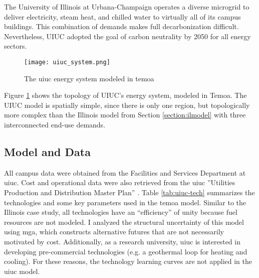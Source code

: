 
The University of Illinois at Urbana-Champaign operates a diverse microgrid to
deliver electricity, steam heat, and chilled water to virtually all of its
campus buildings. This combination of demands makes full decarbonization difficult.
Nevertheless, UIUC adopted the goal of carbon neutrality by 2050 for all energy sectors.

\begin{figure}[H]
  \texttt{[image: uiuc\_system.png]}
  \caption{The \gls{uiuc} energy system modeled in \gls{temoa}}
  \label{fig:uiucsys}
\end{figure}

Figure \ref{fig:uiucsys} shows the topology of UIUC’s energy system, modeled in Temoa.
The UIUC model is spatially simple, since there is only one region, but topologically
more complex than the Illinois model from Section \ref{section:ilmodel} with
three interconnected end-use demands.

\subsection{Model and Data}
All campus data were obtained from the Facilities and Services Department at \gls{uiuc}.
Cost and operational data were also retrieved from the \gls{uiuc} ''Utilities
Production and Distribution Master Plan'' \cite{affiliated_engineers_inc_utilities_2015}.
Table \ref{tab:uiuc-tech} summarizes the technologies and some key parameters
used in the \gls{temoa} model. Similar to the Illinois case study, all technologies have
an ``efficiency'' of unity because fuel resources are not modeled.
I analyzed the structural uncertainty of this model using \gls{mga}, which constructs
alternative futures that are not necessarily motivated by cost. Additionally,
as a research university, \gls{uiuc} is interested in developing pre-commercial
technologies (e.g. a geothermal loop for heating and cooling). For these reasons,
the technology learning curves are not applied in the \gls{uiuc} model.


